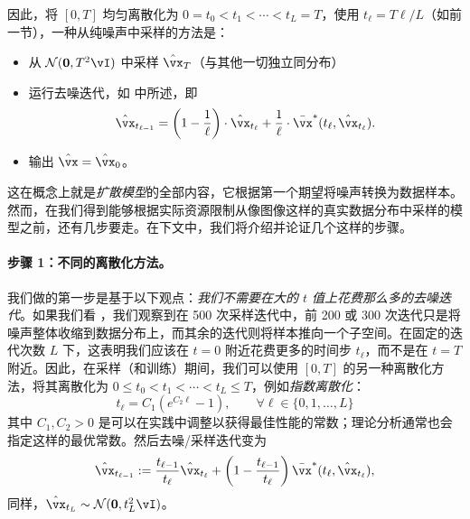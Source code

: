 \documentclass[../../book-main.tex]{subfiles}
\begin{document}
因此，将 \([0, T]\) 均匀离散化为 \(0 = t_{0} < t_{1} < \cdots < t_{L} = T\)，使用 \(t_{\ell} = T\ell / L\)（如前一节），一种从纯噪声中采样的方法是：
\begin{itemize}
	\item 从 \(\dNorm(\vzero, T^{2}\vI)\) 中采样 \(\hat{\vx}_{T}\)（与其他一切独立同分布）
	\item 运行去噪迭代，如  中所述，即
		\begin{equation}\label{eq:denoising-iteration-basic}
		\hat{\vx}_{t_{\ell - 1}} = \bp{1 - \frac{1}{\ell}}\cdot\hat{\vx}_{t_{\ell}} + \frac{1}{\ell}\cdot\bar{\vx}^{\ast}(t_{\ell}, \hat{\vx}_{t_{\ell}}).
	\end{equation}
	\item 输出 \(\hat{\vx} = \hat{\vx}_{0}\)。
\end{itemize}
这在概念上就是\textit{扩散模型}的全部内容，它根据第一个期望将噪声转换为数据样本。然而，在我们得到能够根据实际资源限制从像图像这样的真实数据分布中采样的模型之前，还有几步要走。在下文中，我们将介绍并论证几个这样的步骤。

\paragraph{步骤 1：不同的离散化方法。} 我们做的第一步是基于以下观点：\textit{我们不需要在大的 \(t\) 值上花费那么多的去噪迭代}。如果我们看 ，我们观察到在 500 次采样迭代中，前 200 或 300 次迭代只是将噪声整体收缩到数据分布上，而其余的迭代则将样本推向一个子空间。在固定的迭代次数 \(L\) 下，这表明我们应该在 \(t = 0\) 附近花费更多的时间步 \(t_{\ell}\)，而不是在 \(t = T\) 附近。因此，在采样（和训练）期间，我们可以使用 \([0, T]\) 的另一种离散化方法，将其离散化为 \(0 \leq t_{0} < t_{1} < \cdots < t_{L} \leq T\)，例如\textit{指数离散化}：
\begin{equation}\label{eq:denoising_exponential_discretization}
	t_{\ell} = C_{1}(e^{C_{2}\ell} - 1), \qquad \forall \ell \in \{0, 1, \dots, L\}
\end{equation}
其中 \(C_{1}, C_{2} > 0\) 是可以在实践中调整以获得最佳性能的常数；理论分析通常也会指定这样的最优常数。然后去噪/采样迭代变为
\begin{equation}\label{eq:denoising_iteration}
	\hat{\vx}_{t_{\ell - 1}} := \frac{t_{\ell - 1}}{t_{\ell}}\hat{\vx}_{t_{\ell}} + \bp{1 - \frac{t_{\ell - 1}}{t_{\ell}}}\bar{\vx}^{\ast}(t_{\ell}, \hat{\vx}_{t_{\ell}}),
\end{equation}
同样，\(\hat{\vx}_{t_{L}} \sim \dNorm(\vzero, t_{L}^{2}\vI)\)。
\end{document}
